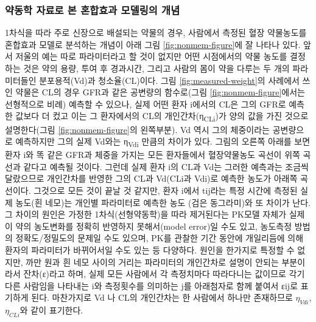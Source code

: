 \documentclass[
  10pt,
  krantz2,
  a4paper]{krantz}
\theoremstyle{definition}
\theoremstyle{definition}
\theoremstyle{definition}
\theoremstyle{remark}
\begin{document}
\hypertarget{uxc57duxb3d9uxd559-uxc790uxb8ccuxb85c-uxbcf8-uxd63cuxd569uxd6a8uxacfc-uxbaa8uxb378uxb9c1uxc758-uxac1cuxb150}{%
\subsubsection{약동학 자료로 본 혼합효과 모델링의 개념}\label{uxc57duxb3d9uxd559-uxc790uxb8ccuxb85c-uxbcf8-uxd63cuxd569uxd6a8uxacfc-uxbaa8uxb378uxb9c1uxc758-uxac1cuxb150}}

1차식을 따라 주로 신장으로 배설되는 약물의 경우, 사람에서 측정된 혈장 약물농도를 혼합효과 모델로 분석하는 개념이 아래 그림 \ref{fig:nonmem-figure}에 잘 나타나 있다. 앞서 저울의 예는 따로 파라미터라고 할 것이 없지만 어떤 시점에서의 약물 농도를 결정하는 것은 약의 용량, 투여 후 경과시간, 그리고 사람의 몸이 약을 다루는 두 개의 파라미터들인 분포용적(Vd)과 청소율(CL)이다. 그림 \ref{fig:measured-weight}의 사례에서 쓰인 약물은 CL의 경우 GFR과 같은 공변량의 함수로(그림 \ref{fig:nonmem-figure}에서는 선형적으로 비례) 예측할 수 있으나, 실제 어떤 환자 i에서의 CL은 그의 GFR로 예측한 값보다 더 컸고 이는 그 환자에서의 CL의 개인간차(η\textsubscript{CLi})가 양의 값을 가진 것으로 설명한다(그림 \ref{fig:nonmem-figure}의 왼쪽부분). Vd 역시 그의 체중이라는 공변량으로 예측하지만 그의 실제 Vd와는 η\textsubscript{Vdi} 만큼의 차이가 있다. 그림의 오른쪽 아래를 보면 환자 i와 똑 같은 GFR과 체중을 가지는 모든 환자들에서 혈장약물농도 곡선이 위쪽 곡선과 같다고 예측될 것이다. 그런데 실제 환자 i의 CL과 Vd는 그러한 예측과는 조금씩 달랐으므로 개인간차를 반영한 그의 CL과 Vd(CLi과 Vdi)로 예측한 농도가 아래쪽 곡선이다. 그것으로 모든 것이 끝날 것 같지만, 환자 i에서 tij라는 특정 시간에 측정된 실제 농도(흰 네모)는 개인별 파라미터로 예측한 농도 (검은 동그라미)와 또 차이가 난다. 그 차이의 원인은 가정한 1차식(선형약동학)을 따라 제거된다는 PK모델 자체가 실제 이 약의 농도변화를 정확히 반영하지 못해서(model error)일 수도 있고, 농도측정 방법의 정확도/정밀도의 문제일 수도 있으며, PK를 관찰한 기간 동안에 개일리듬에 의해 환자의 파라미터가 바뀌어서일 수도 있는 등 다양하다. 원인을 한가지로 특정할 수 없지만, 까만 원과 흰 네모 사이의 거리는 파라미터의 개인간차로 설명이 안되는 부분이라서 잔차(ε)라고 하며, 실제 모든 사람에서 각 측정치마다 따라다니는 값이므로 각기 다른 사람임을 나타내는 i와 측정횟수를 의미하는 j를 아래첨자로 함께 붙여서 εij로 표기하게 된다. 마찬가지로 Vd 나 CL의 개인간차는 한 사람에서 하나만 존재하므로 \(\eta_{Vdi}\), \(\eta_{CLi}\)와 같이 표기한다.

\end{document}
